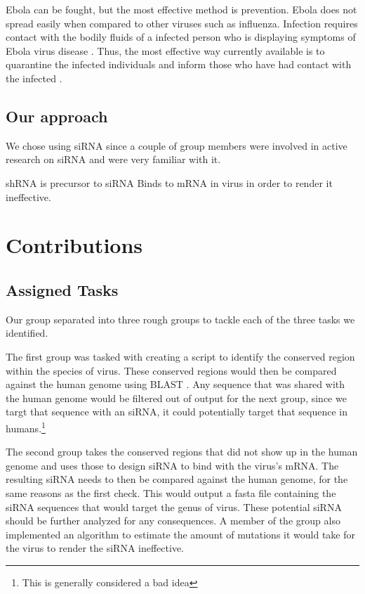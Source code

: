 \documentclass[10pt,letterpaper]{article}
\begin{document}
Ebola can be fought, but the most effective method is prevention.
Ebola does not spread easily when compared to other viruses such as influenza.
Infection requires contact with the bodily fluids of a infected person who is displaying symptoms of Ebola virus disease \cite{wongcharacterization} \cite{team2014ebola}.
Thus, the most effective way currently available is to quarantine the infected individuals and inform those who have had contact with the infected \cite{team2014ebola}.

\subsection{Our approach}
We chose using siRNA since a couple of group members were involved in active research on siRNA and were very familiar with it.

shRNA is precursor to siRNA
Binds to mRNA in virus in order to render it ineffective.


\section{Contributions}




\subsection{Assigned Tasks}
Our group separated into three rough groups to tackle each of the three tasks we identified.

The first group was tasked with creating a script to identify the conserved region within the species of virus.
These conserved regions would then be compared against the human genome using BLAST \cite{blast}.
Any sequence that was shared with the human genome would be filtered out of output for the next group, since we targt that sequence with an siRNA, it could potentially target that sequence in humans.\footnote{This is generally considered a bad idea}

The second group takes the conserved regions that did not show up in the human genome and uses those to design siRNA to bind with the virus's mRNA.
The resulting siRNA needs to then be compared against the human genome, for the same reasons as the first check.
This would output a fasta file containing the siRNA sequences that would target the genus of virus.
These potential siRNA should be further analyzed for any consequences.
A member of the group also implemented an algorithm to estimate the amount of mutations it would take for the virus to render the siRNA ineffective.
\end{document}
